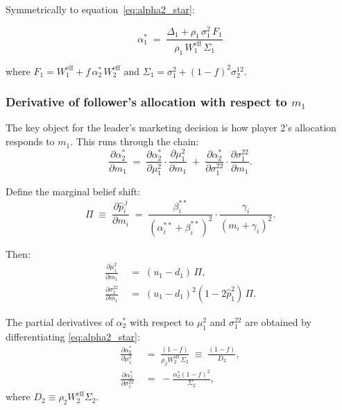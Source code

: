 \documentclass[12pt,a4paper]{article}
\newcommand{\1}{\mathbf{1}}
\newcommand{\hatpij}{\hat{p}_i^{\,j}}
\begin{document}
Symmetrically to equation~\eqref{eq:alpha2_star}:

\begin{equation}
  \boxed{
    \alpha_1^* \;=\;
    \frac{\Delta_1 + \rho_1\,\sigma_1^2\,F_1}
         {\rho_1\,W_1^{\mathrm{eff}}\,\Sigma_1}
  }
  \label{eq:alpha1_star}
\end{equation}

where $F_1 = W_1^{\mathrm{eff}} + f\,\alpha_2^*\,W_2^{\mathrm{eff}}$ and $\Sigma_1 = \sigma_1^2 + (1-f)^2\sigma_2^{12}$.

\subsubsection{Derivative of follower's allocation with respect to $m_1$}

The key object for the leader's marketing decision is how player 2's allocation responds to $m_1$. This runs through the chain:
\[
  \frac{\partial \alpha_2^*}{\partial m_1}
  \;=\;
  \frac{\partial \alpha_2^*}{\partial \mu_1^2}\cdot\frac{\partial \mu_1^2}{\partial m_1}
  \;+\;
  \frac{\partial \alpha_2^*}{\partial \sigma_1^{22}}\cdot\frac{\partial \sigma_1^{22}}{\partial m_1}.
\]

Define the marginal belief shift:
\begin{equation}
  \Pi \;\equiv\; \frac{\partial \hatpij}{\partial m_i}
  \;=\; \frac{\beta_i^{**}}{(\alpha_i^{**}+\beta_i^{**})^2}
  \cdot \frac{\gamma_i}{(m_i+\gamma_i)^2}.
  \label{eq:Pi}
\end{equation}

Then:
\begin{align}
  \frac{\partial \mu_1^2}{\partial m_1} &\;=\; (u_1 - d_1)\,\Pi, \label{eq:dmu_dm}\\
  \frac{\partial \sigma_1^{22}}{\partial m_1} &\;=\; (u_1-d_1)^2(1-2\hat{p}_1^2)\,\Pi. \label{eq:dsig_dm}
\end{align}

The partial derivatives of $\alpha_2^*$ with respect to $\mu_1^2$ and $\sigma_1^{22}$ are obtained by differentiating \eqref{eq:alpha2_star}:
\begin{align}
  \frac{\partial \alpha_2^*}{\partial \mu_1^2}
  &\;=\; \frac{(1-f)}{\rho_2 W_2^{\mathrm{eff}}\,\Sigma_2}
  \;\equiv\; \frac{(1-f)}{D_2},
  \label{eq:dalpha_dmu}\\
  \frac{\partial \alpha_2^*}{\partial \sigma_1^{22}}
  &\;=\; -\frac{\alpha_2^*(1-f)^2}{\Sigma_2},
  \label{eq:dalpha_dsig}
\end{align}
where $D_2 \equiv \rho_2 W_2^{\mathrm{eff}}\Sigma_2$.
\end{document}
